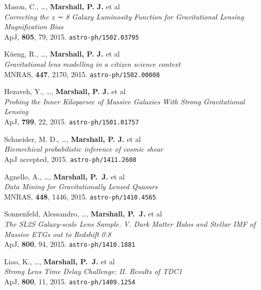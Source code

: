 \begin{revnumerate}
  \item{Mason, C., \ldots, \textbf{Marshall, P. J.} et al\\
  \textit{Correcting the z ∼ 8 Galaxy Luminosity Function for Gravitational Lensing Magnification Bias}\\
  ApJ, \textbf{805}, 79, 2015.
  \texttt{astro-ph/1502.03795}
  }

  \item{K\"{u}eng, R., \ldots, \textbf{Marshall, P. J.} et al\\
  \textit{Gravitational lens modelling in a citizen science context}\\
  MNRAS, \textbf{447}, 2170, 2015.
  \texttt{astro-ph/1502.00008}
  }

  \item{Hezaveh, Y., \ldots, \textbf{Marshall, P. J.} et al\\
  \textit{Probing the Inner Kiloparsec of Massive Galaxies With Strong Gravitational Lensing}\\
  ApJ, {\bf 799}, 22, 2015.
  \texttt{astro-ph/1501.01757}
  }

  \item{Schneider, M. D., \ldots, \textbf{Marshall, P. J.} et al\\
  \textit{Hierarchical probabilistic inference of cosmic shear}\\
  ApJ accepted, 2015.
  \texttt{astro-ph/1411.2608}
  }

  \item{Agnello, A., \ldots, \textbf{Marshall, P.~J.} et al\\
  \textit{Data Mining for Gravitationally Lensed Quasars}\\
  MNRAS, \textbf{448}, 1446, 2015.
  \texttt{astro-ph/1410.4565}
  }

  \item{Sonnenfeld, Alessandro, \ldots, \textbf{Marshall, P.~J.} et al\\
  \textit{The SL2S Galaxy-scale Lens Sample. V. Dark Matter Halos and Stellar IMF of Massive ETGs out to Redshift 0.8}\\
  ApJ, \textbf{800}, 94, 2015.
  \texttt{astro-ph/1410.1881}
  }

  \item{Liao, K., \ldots, \textbf{Marshall, P.~J.} et al\\
  \textit{Strong Lens Time Delay Challenge: II. Results of TDC1}\\
  ApJ, \textbf{800}, 11, 2015.
  \texttt{astro-ph/1409.1254}
  }


\end{revnumerate}
